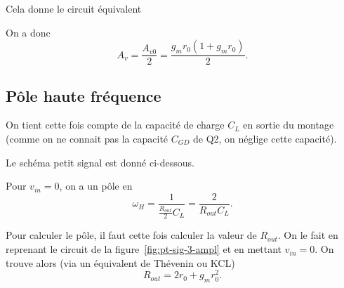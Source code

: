 \documentclass[frenchb,DIV=14]{scrartcl}
\begin{document}
Cela donne le circuit équivalent
\begin{center}
\end{center}

On a donc \[A_v = \frac{A_{v0}}{2} = \frac{g_mr_0(1+g_mr_0)}{2}.\]

\subsection*{Pôle haute fréquence}

On tient cette fois compte de la capacité de charge $C_L$ en sortie du montage
(comme on ne connait pas la capacité $C_{GD}$ de Q2, on néglige cette capacité).

Le schéma petit signal est donné ci-dessous.
\begin{center}
\end{center}

Pour $v_{in} = 0$, on a un pôle en
\[\omega_H = \frac{1}{\frac{R_{out}}{2}C_L} = \frac{2}{R_{out}C_L}.\]

Pour calculer le pôle, il faut cette fois calculer la valeur de $R_{out}$.
On le fait en reprenant le circuit de la figure~\ref{fig:pt-sig-3-ampl} et
en mettant $v_{in} = 0$. On trouve alors (via un équivalent de Thévenin
ou KCL)
\[R_{out} = 2r_0 + g_m r_0^2.\]
\end{document}
